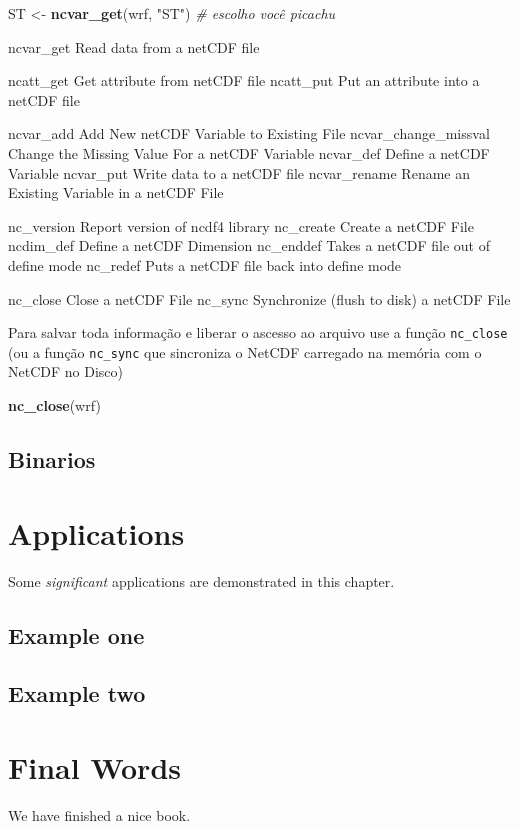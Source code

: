\documentclass[]{book}
\newenvironment{Shaded}{\begin{snugshade}}{\end{snugshade}}
\newcommand{\KeywordTok}[1]{\textcolor[rgb]{0.13,0.29,0.53}{\textbf{#1}}}
\newcommand{\StringTok}[1]{\textcolor[rgb]{0.31,0.60,0.02}{#1}}
\newcommand{\CommentTok}[1]{\textcolor[rgb]{0.56,0.35,0.01}{\textit{#1}}}
\newcommand{\NormalTok}[1]{#1}
\theoremstyle{definition}
\theoremstyle{definition}
\theoremstyle{definition}
\theoremstyle{remark}
\begin{document}
\begin{Shaded}
\begin{Highlighting}[]
\NormalTok{ST <-}\StringTok{ }\KeywordTok{ncvar_get}\NormalTok{(wrf, }\StringTok{"ST"}\NormalTok{)  }\CommentTok{# escolho você picachu}
\end{Highlighting}
\end{Shaded}

ncvar\_get Read data from a netCDF file

ncatt\_get Get attribute from netCDF file ncatt\_put Put an attribute
into a netCDF file

ncvar\_add Add New netCDF Variable to Existing File
ncvar\_change\_missval Change the Missing Value For a netCDF Variable
ncvar\_def Define a netCDF Variable ncvar\_put Write data to a netCDF
file ncvar\_rename Rename an Existing Variable in a netCDF File

nc\_version Report version of ncdf4 library nc\_create Create a netCDF
File ncdim\_def Define a netCDF Dimension nc\_enddef Takes a netCDF file
out of define mode nc\_redef Puts a netCDF file back into define mode

nc\_close Close a netCDF File nc\_sync Synchronize (flush to disk) a
netCDF File

Para salvar toda informação e liberar o ascesso ao arquivo use a função
\texttt{nc\_close} (ou a função \texttt{nc\_sync} que sincroniza o
NetCDF carregado na memória com o NetCDF no Disco)

\begin{Shaded}
\begin{Highlighting}[]
\KeywordTok{nc_close}\NormalTok{(wrf)}
\end{Highlighting}
\end{Shaded}

\section{Binarios}\label{binarios}

\chapter{Applications}\label{applications}

Some \emph{significant} applications are demonstrated in this chapter.

\section{Example one}\label{example-one}

\section{Example two}\label{example-two}

\chapter{Final Words}\label{final-words}

We have finished a nice book.


\end{document}
